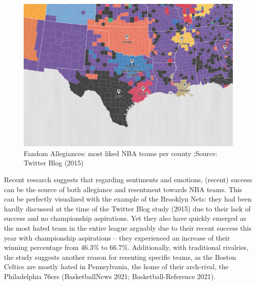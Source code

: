\documentclass[
]{article}
\begin{document}
\begin{figure}

{\centering \includegraphics[width=8.72in,height=0.4\textheight]{../output/Figure 2 - NBA Fandoms Map Southwest (Twitter Blog 2015)} 

}

\caption{Fandom Allegiances: most liked NBA teams per county ;Source: Twitter Blog (2015)}\label{fig:unnamed-chunk-2-2}
\end{figure}

Recent research suggests that regarding sentiments and emotions,
(recent) success can be the source of both allegiance and resentment
towards NBA teams. This can be perfectly visualized with the example of
the Brooklyn Nets: they had been hardly discussed at the time of the
Twitter Blog study (2015) due to their lack of success and no
championship aspirations. Yet they also have quickly emerged as the most
hated team in the entire league arguably due to their recent success
this year with championship aspirations -- they experienced an increase
of their winning percentage from 46.3\% to 66.7\%. Additionally, with
traditional rivalries, the study suggests another reason for resenting
specific teams, as the Boston Celtics are mostly hated in Pennsylvania,
the home of their arch-rival, the Philadelphia 76ers (BasketballNews
2021; Basketball-Reference 2021).
\end{document}
